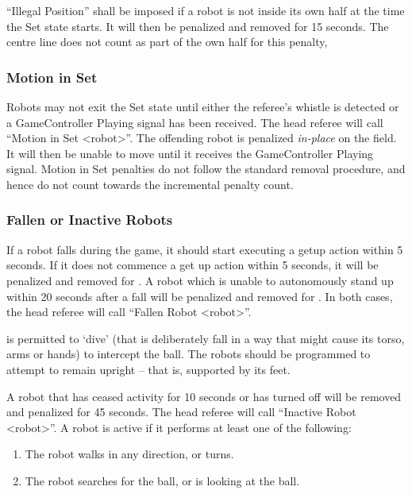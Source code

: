 ``Illegal Position'' shall be imposed if a robot is not inside its own half at the time the Set state starts. It will then be penalized and removed for 15 seconds. The centre line does not count as part of the own half for this penalty, 

\subsubsection{Motion in Set}
\label{sec:motion_in_set}

Robots may not exit the Set state until either the referee's whistle is detected or a GameController Playing signal has been received.
The head referee will call ``Motion in Set \textless robot\textgreater''.
The offending robot is penalized \textit{in-place} on the field. It will then be unable to move until it receives the GameController Playing signal. Motion in Set penalties do not follow the standard removal procedure, and hence do not count towards the incremental penalty count.

\subsubsection{Fallen or Inactive Robots}
\label{sec:fallenrobots}

If a robot falls during the game, it should start executing a getup action within 5 seconds. If it does not commence a get up action within 5 seconds, it will be penalized and removed for \StandardPenaltyTime.
A robot which is unable to autonomously stand up within 20 seconds after a fall  will be penalized and removed for \StandardPenaltyTime. 
In both cases, the head referee will call ``Fallen Robot  \textless robot\textgreater''.

 is permitted to `dive' (that is deliberately fall in a way that might cause its torso, arms or hands) to intercept the ball. The robots should be programmed to attempt to remain upright -- that is, supported by its feet.

A robot that has ceased activity for 10 seconds or has turned off will be removed and penalized for 45 seconds.
The head referee will call ``Inactive Robot  \textless robot\textgreater''.
A robot is active if it performs at least one of the following:
\begin{enumerate}
	\item The robot walks in any direction, or turns.
	\item The robot searches for the ball, or is looking at the ball.
\end{enumerate}

